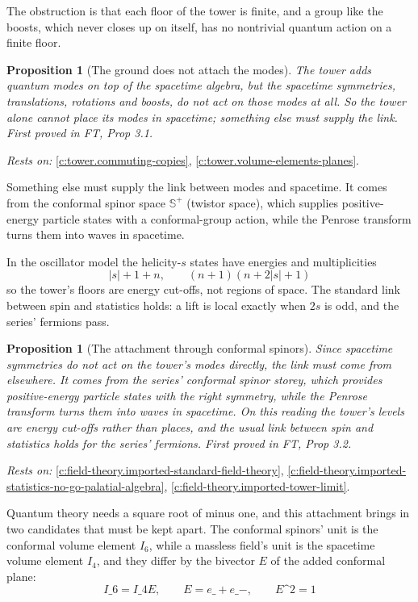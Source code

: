 \documentclass[11pt]{article}
\newtheorem{proposition}[theorem]{Proposition}
\theoremstyle{definition}
\theoremstyle{plain}
\providecommand{\CS}{}\renewcommand{\CS}{{\mathbb{S}^{+}}}
\begin{document}
The obstruction is that each floor of the tower is finite, and a group like the boosts, which never closes up on itself, has no nontrivial quantum action on a finite floor.

\begin{proposition}[The ground does not attach the modes]\label{c:field-theory.ground-does-not-attach-modes}
The tower adds quantum modes on top of the spacetime algebra, but the spacetime symmetries, translations, rotations and boosts, do not act on those modes at all. So the tower alone cannot place its modes in spacetime; something else must supply the link.
\emph{First proved in} FT, Prop 3.1.
\end{proposition}
\noindent\emph{Rests on:} \ref{c:tower.commuting-copies}, \ref{c:tower.volume-elements-planes}.

Something else must supply the link between modes and spacetime. It comes from the conformal spinor space $\CS$ (twistor space), which supplies positive-energy particle states with a conformal-group action, while the Penrose transform turns them into waves in spacetime.

In the oscillator model the helicity-$s$ states have energies and multiplicities \[ |s| + 1 + n , \qquad (n+1)(n + 2|s| + 1) \] so the tower's floors are energy cut-offs, not regions of space. The standard link between spin and statistics holds: a lift is local exactly when $2s$ is odd, and the series' fermions pass.

\begin{proposition}[The attachment through conformal spinors]\label{c:field-theory.twistor-attachment}
Since spacetime symmetries do not act on the tower's modes directly, the link must come from elsewhere. It comes from the series' conformal spinor storey, which provides positive-energy particle states with the right symmetry, while the Penrose transform turns them into waves in spacetime. On this reading the tower's levels are energy cut-offs rather than places, and the usual link between spin and statistics holds for the series' fermions.
\emph{First proved in} FT, Prop 3.2.
\end{proposition}
\noindent\emph{Rests on:} \ref{c:field-theory.imported-standard-field-theory}, \ref{c:field-theory.imported-statistics-no-go-palatial-algebra}, \ref{c:field-theory.imported-tower-limit}.

Quantum theory needs a square root of minus one, and this attachment brings in two candidates that must be kept apart. The conformal spinors' unit is the conformal volume element $I_6$, while a massless field's unit is the spacetime volume element $I_4$, and they differ by the bivector $E$ of the added conformal plane: \[ I\_6 = I\_4 E , \qquad E = e\_+ e\_- , \qquad E\^{}2 = 1 \]
\end{document}
